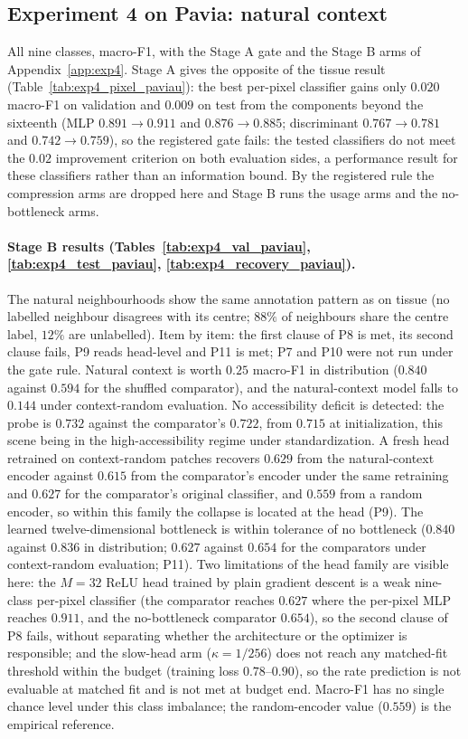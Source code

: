 \subsection{Experiment 4 on Pavia: natural context}
All nine classes, macro-F1, with the Stage A gate and the Stage B arms of
Appendix~\ref{app:exp4}. Stage A gives the opposite of the tissue result
(Table~\ref{tab:exp4_pixel_paviau}): the best per-pixel classifier gains only $0.020$
macro-F1 on validation and $0.009$ on test from the components beyond the sixteenth
(MLP $0.891\to0.911$ and $0.876\to0.885$; discriminant $0.767\to0.781$ and
$0.742\to0.759$), so the registered gate fails: the tested classifiers do not meet the
$0.02$ improvement criterion on both evaluation sides, a performance result for these
classifiers rather than an information bound. By the registered rule the compression
arms are dropped here and Stage B runs the usage arms and the no-bottleneck arms.

\paragraph{Stage B results (Tables~\ref{tab:exp4_val_paviau}, \ref{tab:exp4_test_paviau},
\ref{tab:exp4_recovery_paviau}).} The natural neighbourhoods show the same annotation
pattern as on tissue (no labelled neighbour disagrees with its centre; $88\%$ of
neighbours share the centre label, $12\%$ are unlabelled). Item by item: the first
clause of P8 is met, its second clause fails, P9 reads head-level and P11 is met; P7 and
P10 were not run under the gate rule. Natural context is worth $0.25$ macro-F1 in
distribution ($0.840$ against $0.594$ for the shuffled comparator), and the
natural-context model falls to $0.144$ under context-random evaluation. No
accessibility deficit is detected: the probe is $0.732$ against the comparator's
$0.722$, from $0.715$ at initialization, this scene being in the high-accessibility
regime under standardization. A fresh head retrained on context-random patches recovers
$0.629$ from the natural-context encoder against $0.615$ from the comparator's encoder
under the same retraining and $0.627$ for the comparator's original classifier, and
$0.559$ from a random encoder, so within this family the collapse is located at the
head (P9). The learned twelve-dimensional bottleneck is within tolerance of no
bottleneck ($0.840$ against $0.836$ in distribution; $0.627$ against $0.654$ for the
comparators under context-random evaluation; P11). Two limitations of the head family
are visible here: the $M=32$ ReLU head trained by plain gradient descent is a weak
nine-class per-pixel classifier (the comparator reaches $0.627$ where the per-pixel MLP
reaches $0.911$, and the no-bottleneck comparator $0.654$), so the second clause of P8
fails, without separating whether the architecture or the optimizer is responsible;
and the slow-head arm ($\kappa=1/256$) does not reach any matched-fit threshold within
the budget (training loss $0.78$--$0.90$), so the rate prediction is not evaluable at
matched fit and is not met at budget end. Macro-F1 has no single chance level under
this class imbalance; the random-encoder value ($0.559$) is the empirical reference.



